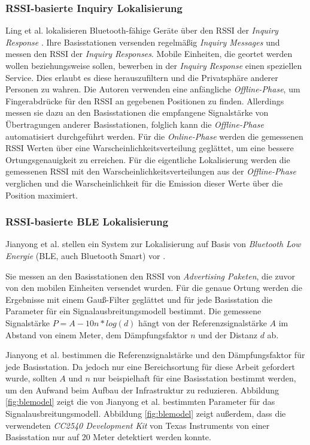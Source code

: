 \subsubsection{RSSI-basierte Inquiry Lokalisierung}
\label{ch:Vorherige:sec:inq}
Ling et al. lokalisieren Bluetooth-fähige Geräte über den RSSI der \emph{Inquiry Response} \cite{ling2010inquiry}.
Ihre Basisstationen versenden regelmäßig \emph{Inquiry Messages} und messen den RSSI der \emph{Inquiry Responses}.
Mobile Einheiten, die geortet werden wollen beziehungsweise sollen, bewerben in der \emph{Inquiry Response} einen speziellen Service.
Dies erlaubt es diese herauszufiltern und die Privatsphäre anderer Personen zu wahren.
Die Autoren verwenden eine anfängliche \emph{Offline-Phase}, um Fingerabdrücke für den RSSI an gegebenen Positionen zu finden.
Allerdings messen sie dazu an den Basisstationen die empfangene Signalstärke von Übertragungen anderer Basisstationen, folglich kann die \emph{Offline-Phase} automatisiert durchgeführt werden.
Für die \emph{Online-Phase} werden die gemessenen RSSI Werten über eine Warscheinlichkeitsverteilung geglättet, um eine bessere Ortungsgenauigkeit zu erreichen.
Für die eigentliche Lokalisierung werden die gemessenen RSSI mit den Warscheinlichkeitsverteilungen aus der \emph{Offline-Phase} verglichen und die Warscheinlichkeit für die Emission dieser Werte über die Position maximiert.

\subsubsection{RSSI-basierte BLE Lokalisierung}
\label{ch:Vorherige:sec:adv}
Jianyong et al. stellen ein System zur Lokalisierung auf Basis von \emph{Bluetooth Low Energie} (BLE, auch Bluetooth Smart) vor \cite{jianyong2014rssi}. 

Sie messen an den Basisstationen den RSSI von \emph{Advertising Paketen}, die zuvor von den mobilen Einheiten versendet wurden.
Für die genaue Ortung werden die Ergebnisse mit einem Gauß-Filter geglättet und für jede Basisstation die Parameter für ein Signalausbreitungsmodell bestimmt.
Die gemessene Signalstärke $P = A - 10n*log(d)$ hängt von der Referenzsignalstärke $A$ im Abstand von einem Meter, dem Dämpfungsfaktor $n$ und der Distanz $d$ ab. 

Jianyong et al. bestimmen die Referenzsignalstärke und den Dämpfungsfaktor für jede Basisstation.
Da jedoch nur eine Bereichsortung für diese Arbeit gefordert wurde, sollten $A$ und $n$ nur beispielhaft für eine Basisstation bestimmt werden, um den Aufwand beim Aufbau der Infrastruktur zu reduzieren.
Abbildung \ref{fig:blemodel} zeigt die von Jianyong et al. bestimmten Parameter für das Signalausbreitungsmodell. 
Abbildung \ref{fig:blemodel} zeigt außerdem, dass die verwendeten \emph{CC2540 Development Kit} von Texas Instruments von einer Basisstation nur auf 20 Meter detektiert werden konnte.


